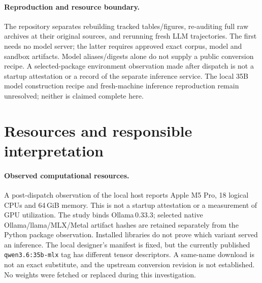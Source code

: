 \documentclass{article}
\begin{document}
\paragraph{Reproduction and resource boundary.}
The repository separates rebuilding tracked tables/figures, re-auditing full
raw archives at their original sources, and rerunning fresh LLM trajectories.
The first needs no model server; the latter requires approved exact corpus,
model and sandbox artifacts. Model aliases/digests alone do not supply a public
conversion recipe. A selected-package environment observation made after
dispatch is not a startup attestation or a record of the separate inference
service. The local 35B model construction recipe and fresh-machine inference
reproduction remain unresolved; neither is claimed complete here.

\section{Resources and responsible interpretation}
\label{sec:resources-ethics}
\paragraph{Observed computational resources.}
A post-dispatch observation of the local host reports Apple M5 Pro,
18 logical CPUs and 64\,GiB memory. This is not a startup attestation or a
measurement of GPU utilization. The study binds Ollama\,0.33.3; selected native
Ollama/llama/MLX/Metal artifact hashes are retained separately from the Python
package observation. Installed libraries do not prove which variant served an
inference. The local designer's manifest is fixed, but the currently published
\texttt{qwen3.6:35b-mlx} tag has different tensor descriptors. A same-name
download is not an exact substitute, and the upstream conversion revision is
not established. No weights were fetched or replaced during this investigation.
\end{document}
